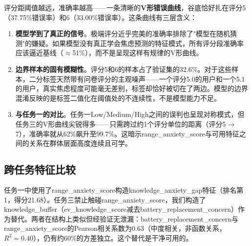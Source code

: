 评分距阈值越远，准确率越高——一条清晰的\textbf{V形错误曲线}，谷底恰好扎在评分5（37.75\%错误率）和6（33.00\%错误率）。这条曲线有三层含义：

\begin{enumerate}[itemsep=0pt]
\item \textbf{模型学到了真正的信号}。极端评分近乎完美的准确率排除了"模型在随机猜测"的嫌疑。如果模型没有真正学会焦虑预测的特征模式，所有评分段准确率应该逼近基线（$\approx$51\%），而不是呈现这样有规律的V形曲线。
\item \textbf{边界样本的固有模糊性}。评分5和6的样本占了验证集的32.6\%。对于这些样本，二分标签天然带有问卷评分的主观噪声——一个评分5.0的用户和一个5.1的用户，真实焦虑程度可能毫无差别，标签却恰好被切在了两边。模型的边界混淆反映的是标签二值化在阈值处的不连续性，不是模型能力不足。
\item \textbf{与任务一的对比}。任务一Low/Medium/High之间的误判也呈现对称模式，但任务三的V形曲线尖锐得多——只需跨过约1个评分单位的距离（评分5$\to$7），准确率就从62\%飙升至99.7\%。这暗示range\_anxiety\_score与可用特征之间的关系在群体层面高度连续且可学。
\end{enumerate}

\subsection{跨任务特征比较}

任务一中使用了range\_anxiety\_score构造knowledge\_anxiety\_gap特征（排名第1，得分21.68）。任务三禁止触碰range\_anxiety\_score，我们构造了knowledge\_buffer（ev\_knowledge\_score减去battery\_replacement\_concern）作为替代。两者在结构上类似但经验证无泄漏：battery\_replacement\_concern与range\_anxiety\_score的Pearson相关系数为0.63（中度相关，非函数关系，$R^2=0.40$），仍有约60\%的方差独立。这个替代是干净可用的。
